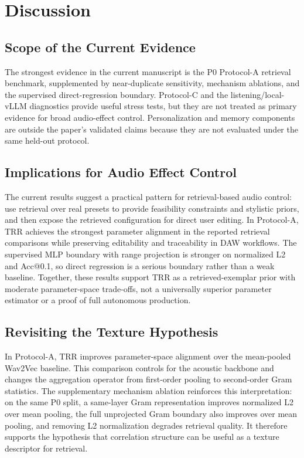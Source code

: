 \section{Discussion}
\label{sec:discussion}

\subsection{Scope of the Current Evidence}
\label{ssec:memory_exp}

The strongest evidence in the current manuscript is the P0 Protocol-A retrieval benchmark, supplemented by near-duplicate sensitivity, mechanism ablations, and the supervised direct-regression boundary. Protocol-C and the listening/local-vLLM diagnostics provide useful stress tests, but they are not treated as primary evidence for broad audio-effect control. Personalization and memory components are outside the paper's validated claims because they are not evaluated under the same held-out protocol.

\subsection{Implications for Audio Effect Control}

The current results suggest a practical pattern for retrieval-based audio control: use retrieval over real presets to provide feasibility constraints and stylistic priors, and then expose the retrieved configuration for direct user editing. In Protocol-A, TRR achieves the strongest parameter alignment in the reported retrieval comparisons while preserving editability and traceability in DAW workflows. The supervised MLP boundary with range projection is stronger on normalized L2 and Acc@0.1, so direct regression is a serious boundary rather than a weak baseline. Together, these results support TRR as a retrieved-exemplar prior with moderate parameter-space trade-offs, not a universally superior parameter estimator or a proof of full autonomous production.

\subsection{Revisiting the Texture Hypothesis}

In Protocol-A, TRR improves parameter-space alignment over the mean-pooled Wav2Vec baseline. This comparison controls for the acoustic backbone and changes the aggregation operator from first-order pooling to second-order Gram statistics. The supplementary mechanism ablation reinforces this interpretation: on the same P0 split, a same-layer Gram representation improves normalized L2 over mean pooling, the full unprojected Gram boundary also improves over mean pooling, and removing L2 normalization degrades retrieval quality. It therefore supports the hypothesis that correlation structure can be useful as a texture descriptor for retrieval.

